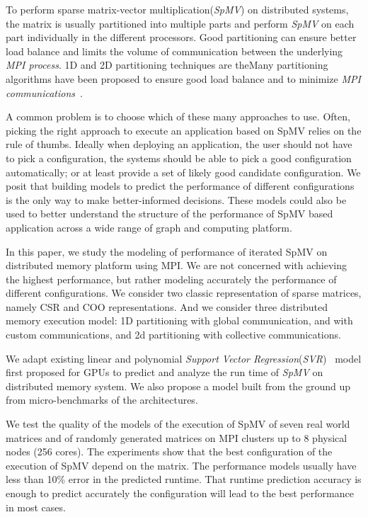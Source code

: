 \documentclass[conference, 10ppt]{IEEEtran}
\begin{document}
To perform sparse matrix-vector multiplication(\textit{SpMV}) on
distributed systems, the matrix is usually partitioned into multiple
parts and perform \textit{SpMV} on each part individually in the
different processors. Good partitioning can ensure better load balance
and limits the volume of communication between the underlying
\textit{MPI process}. 1D and 2D partitioning techniques are theMany partitioning algorithms have been proposed
to ensure good load balance and to minimize \textit{MPI
  communications}~\cite{deveci2015hypergraph, karypis1995multilevel,
  kaya2013analysis}.

A common problem is to choose which of these many approaches to use.
Often, picking the right approach to execute an application based on
SpMV relies on the rule of thumbs. Ideally when deploying an
application, the user should not have to pick a configuration, the
systems should be able to pick a good configuration automatically; or
at least provide a set of likely good candidate configuration. We
posit that building models to predict the performance of different
configurations is the only way to make better-informed
decisions. These models could also be used to better understand the
structure of the performance of SpMV based application across a wide
range of graph and computing platform.

In this paper, we study the modeling of performance of iterated SpMV
on distributed memory platform using MPI. We are not concerned with
achieving the highest performance, but rather modeling accurately the
performance of different configurations. We consider two classic
representation of sparse matrices, namely CSR and COO
representations. And we consider three distributed memory execution
model: 1D partitioning with global communication, and with custom
communications, and 2d partitioning with collective communications.

We adapt existing linear and polynomial \textit{Support Vector
  Regression}(\textit{SVR})~\cite{awad2015support} model first
proposed for GPUs to predict and analyze the run time of \textit{SpMV}
on distributed memory system. We also propose a model built from the
ground up from micro-benchmarks of the architectures.

We test the quality of the models of the execution of SpMV of seven
real world matrices and of randomly generated matrices on MPI clusters
up to 8 physical nodes (256 cores). The experiments show that the best
configuration of the execution of SpMV depend on the matrix. The
performance models usually have less than 10\% error in the predicted
runtime. That runtime prediction accuracy is enough to predict
accurately the configuration will lead to the best performance in most
cases.
\end{document}
